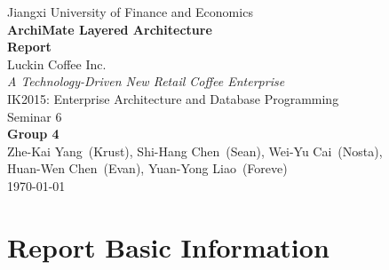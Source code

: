 \documentclass[12pt,a4paper]{article}
\title{}
\author{}
\date{}
\begin{document}
\thispagestyle{empty}
\vspace*{1.8cm}

\begin{center}
  {\normalsize Jiangxi University of Finance and Economics} \\[2.1cm]

  {\LARGE\bfseries ArchiMate Layered Architecture} \\[0.15cm]
  {\LARGE\bfseries Report} \\[1.0cm]

  {\Large Luckin Coffee Inc.} \\[0.25cm]
  {\normalsize\itshape A Technology-Driven New Retail Coffee Enterprise} \\[2.0cm]

  {\normalsize IK2015: Enterprise Architecture and Database Programming} \\[0.2cm]
  {\normalsize Seminar 6} \\[2.2cm]

  {\normalsize\textbf{Group 4}} \\[0.45cm]
  {\normalsize
    Zhe-Kai Yang~(Krust),\quad
    Shi-Hang Chen~(Sean),\quad
    Wei-Yu Cai~(Nosta), \\[0.2cm]
    Huan-Wen Chen~(Evan),\quad
    Yuan-Yong Liao~(Foreve)
  } \\[1.8cm]

  {\normalsize \today}
\end{center}

\newpage
\hypersetup{pageanchor=true}
\setcounter{page}{1}
\pagestyle{fancy}

\section{Report Basic Information}
\end{document}
